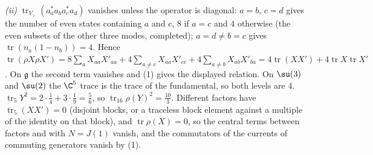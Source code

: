\emph{(ii)} $\operatorname{tr}_{V_{+}}(a^{*}_{a}a_{b}a^{*}_{c}a_{d})$ vanishes unless the operator is diagonal: $a = b$, $c = d$ gives the number of even states containing $a$ and $c$, $8$ if $a = c$ and $4$ otherwise (the even subsets of the other three modes, completed); $a = d \ne b = c$ gives $\operatorname{tr}(n_{a}(1 - n_{b})) = 4$. Hence $\operatorname{tr}(\rho X\rho X') = 8\sum_{a}X_{aa}X'_{aa} + 4\sum_{a \ne c}X_{aa}X'_{cc} + 4\sum_{a \ne b}X_{ab}X'_{ba} = 4\operatorname{tr}(XX') + 4\operatorname{tr}X\operatorname{tr}X'$. On $\mathfrak{g}$ the second term vanishes and (1) gives the displayed relation. On $\su(3)$ and $\su(2)$ the $\C^{5}$ trace is the trace of the fundamental, so both levels are $4$. $\operatorname{tr}_{5}Y^{2} = 2\cdot\tfrac14 + 3\cdot\tfrac19 = \tfrac56$, so $\operatorname{tr}_{16}\rho(Y)^{2} = \tfrac{10}{3}$. Different factors have $\operatorname{tr}_{5}(XX') = 0$ (disjoint blocks, or a traceless block element against a multiple of the identity on that block), and $\operatorname{tr}\rho(X) = 0$, so the central terms between factors and with $N = J(1)$ vanish, and the commutators of the currents of commuting generators vanish by (1).


